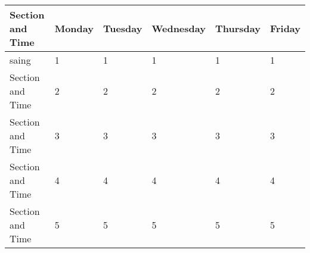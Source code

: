 \def \firstPeriod{1}
\def \secondPeriod{2}
\def \thirdPeriod{3}
\def \fourthPeriod{4}
\def \fifthPeriod{5}
\def \sixthPeriod{6}

\noindent\begin{minipage}[c]{\textwidth}
\begin{center}
  \begin{tabular}{ *{6}{|C{120pt}}|  }
    \hline
   \textbf{ Section and Time} & \textbf{Monday} & \textbf{Tuesday} & \textbf{Wednesday} & \textbf{Thursday} & \textbf{Friday} \\
    \hline
        saing & \firstPeriod & \firstPeriod & \firstPeriod & \firstPeriod & \firstPeriod \\
    \hline
        Section and Time & \secondPeriod & \secondPeriod & \secondPeriod & \secondPeriod & \secondPeriod \\
    \hline
        Section and Time & \thirdPeriod & \thirdPeriod & \thirdPeriod & \thirdPeriod & \thirdPeriod \\
    \hline
        Section and Time & \fourthPeriod & \fourthPeriod & \fourthPeriod & \fourthPeriod & \fourthPeriod \\
    \hline
        Section and Time & \fifthPeriod & \fifthPeriod & \fifthPeriod & \fifthPeriod & \fifthPeriod \\
  \hline
 \end{tabular}
\end{center}
\end{minipage}
